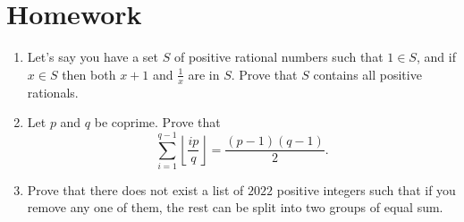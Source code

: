 \documentclass{article}
\begin{document}
\section{Homework}
\begin{enumerate}
	\item Let's say you have a set $S$ of positive rational numbers such that
	      $1\in S$, and if $x\in S$ then both $x+1$ and $\frac 1x$ are in $S$. Prove
	      that $S$ contains all positive rationals.
	\item Let $p$ and $q$ be coprime. Prove that
	      \[\sum_{i=1}^{q-1}\left\lfloor\frac{ip}{q}\right\rfloor=\frac{(p-1)(q-1)}2.\]
	\item Prove that there does not exist a list of $2022$ positive integers
	      such that if you remove any one of them, the rest can be split into two
	      groups of equal sum.
\end{enumerate}
\end{document}

